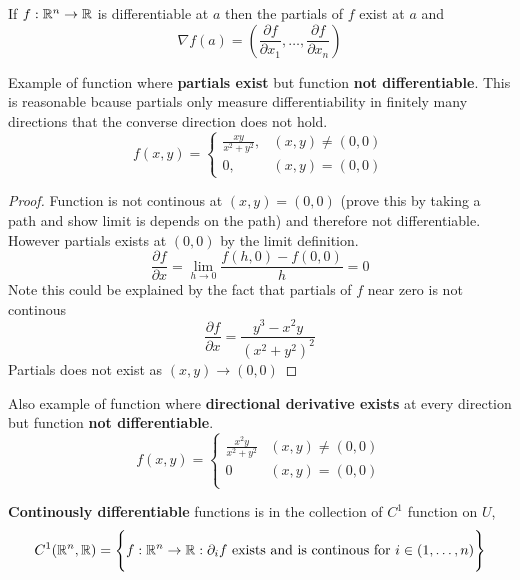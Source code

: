 \documentclass[11pt]{article}
\begin{document}
\begin{theorem}
  \label{multivariable function gradient}
  If $f:\mathbb{R}^n\to \mathbb{R}$ is differentiable at $a$ then the partials of $f$ exist at $a$ and
  \[
    \nabla f(a) = (\frac{\partial f}{\partial x_1}, \dots, \frac{\partial f}{\partial x_n})
  \]
\end{theorem}

\begin{rem}
  $ $\\
  Example of function where \textbf{partials exist} but function \textbf{not differentiable}. This is reasonable bcause partials only measure differentiability in finitely many directions that the converse direction does not hold.
  \[
    f(x,y) =
    \begin{cases}
      \frac{xy}{x^2 + y^2}, & (x,y) \neq (0,0)\\
      0, & (x,y)= (0,0)
    \end{cases}
  \]
  \begin{proof}
    Function is not continous at $(x,y)= (0,0)$ (prove this by taking a path and show limit is depends on the path) and therefore not differentiable. However partials exists at $(0,0)$ by the limit definition.
    \[
      \frac{\partial f}{\partial x} = \lim_{h\to 0} \frac{f(h,0) - f(0,0)}{h} = 0
    \]
    $ $\\
    Note this could be explained by the fact that partials of $f$ near zero is not continous
    \[
      \frac{\partial f}{\partial x} = \frac{y^3 - x^2y}{(x^2 + y^2)^2}
    \]
    Partials does not exist as $(x,y)\to (0,0)$
  \end{proof}


  Also example of function where \textbf{directional derivative exists} at every direction but function \textbf{not differentiable}.
  \[
    f(x,y) =
    \begin{cases}
      \frac{x^2y}{x^2 + y^2} & (x,y)\neq (0,0)\\
      0 & (x,y) = (0,0)\\
    \end{cases}
  \]

\end{rem}


\begin{defn}
  \label{c1 function} \textbf{Continously differentiable} functions is in the collection of $C^1$ function on $U$,
  \[
    C^1(\mathbb{R}^n, \mathbb{R}) = \Bigg\{ f:\mathbb{R}^n\to \mathbb{R}: \partial_i f \text{ exists and is continous for } i\in (1,\dots,n) \Bigg\}
  \]
\end{defn}
\end{document}
